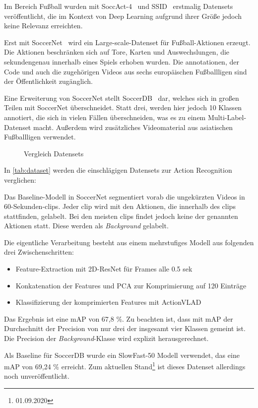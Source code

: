 Im Bereich Fußball wurden mit SoccAct-4~\cite{Ballan09} und SSID~\cite{Jiang16} erstmalig Datensets veröffentlicht, die im Kontext von Deep Learning aufgrund ihrer Größe jedoch keine Relevanz erreichten.

Erst mit SoccerNet~\cite{Giancola18} wird ein Large-scale-Datenset für Fußball-Aktionen erzeugt.
Die Aktionen beschränken sich auf Tore, Karten und Auswechslungen, die sekundengenau innerhalb eines Spiels erhoben wurden.
Die \gls{annotationen}, der Code und auch die zugehörigen Videos aus sechs europäischen Fußballligen sind der Öffentlichkeit zugänglich.

Eine Erweiterung von SoccerNet stellt SoccerDB~\cite{Jiang19} dar, welches sich in großen Teilen mit SoccerNet überschneidet.
Statt drei, werden hier jedoch 10 Klassen annotiert, die sich in vielen Fällen überschneiden, was es zu einem Multi-Label-Datenset macht.
Außerdem wird zusätzliches Videomaterial aus asiatischen Fußballligen verwendet.

\begin{figure}
    \centering
    \caption[Vergleich Datensets]{Vergleich Datensets}
    \label{tab:dataset}
\end{figure}

In \autoref{tab:dataset} werden die einschlägigen Datensets zur Action Recognition verglichen:

Das Baseline-Modell in SoccerNet segmentiert vorab die ungekürzten Videos in 60-Sekunden-\glspl{clip}.
Jeder \gls{clip} wird mit den Aktionen, die innerhalb des \glspl{clip} stattfinden, gelabelt.
Bei den meisten \glspl{clip} findet jedoch keine der genannten Aktionen statt.
Diese werden als \emph{Background} gelabelt.

Die eigentliche Verarbeitung besteht aus einem mehrstufiges Modell aus folgenden drei Zwischenschritten:

\begin{itemize}
    \item Feature-Extraction mit 2D-ResNet für Frames alle 0.5 sek
    \item Konkatenation der Features und PCA zur Komprimierung auf 120 Einträge
    \item Klassifizierung der komprimierten Features mit ActionVLAD
\end{itemize}

Das Ergebnis ist eine mAP von 67,8 \%.
Zu beachten ist, dass mit mAP der Durchschnitt der Precision von nur drei der insgesamt vier Klassen gemeint ist.
Die Precision der \emph{Background}-Klasse wird explizit herausgerechnet.

Als Baseline für SoccerDB wurde ein SlowFast-50 Modell verwendet, das eine mAP von 69,24 \% erreicht.
Zum aktuellen Stand\footnote{01.09.2020} ist dieses Datenset allerdings noch unveröffentlicht.

